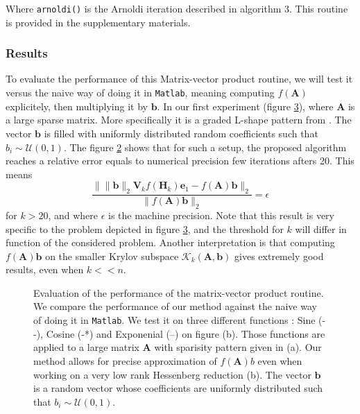\documentclass[11pt]{article}
\numberwithin{equation}{section}
\begin{document}
Where \texttt{arnoldi()} is the Arnoldi iteration described in algorithm 3. This routine is provided in the supplementary materials.

\subsubsection{Results}
To evaluate the performance of this Matrix-vector product routine, we will test it versus the naive way of doing it in \texttt{Matlab}, meaning computing $f(\mathbf{A})$ explicitely, then multiplying it by $\mathbf{b}$. In our first experiment (figure \ref{fig:comp_fab}), where $\mathbf{A}$ is a large sparse matrix. More specifically it is a graded L-shape pattern from \cite{george1978automatic}. The vector $\mathbf{b}$ is filled with uniformly distributed random coefficients such that $b_i\sim\mathcal{U}(0,1)$. The figure \ref{fig:comp_fab_assignement} shows that for such a setup, the proposed algorithm reaches a relative error equals to numerical precision few iterations afters 20. This means 
\begin{equation*}
    \frac{\|\|\mathbf{b}\|_2\mathbf{V}_k f(\mathbf{H}_k)\mathbf{e}_1 - f(\mathbf{A})\mathbf{b}\|_2}{\|f(\mathbf{A})\mathbf{b}\|_2} = \epsilon
\end{equation*}
for $k > 20$, and where $\epsilon$ is the machine precision. Note that this result is very specific to the problem depicted in figure \ref{fig:comp_fab}, and the threshold for $k$ will differ in function of the considered problem. Another interpretation is that computing $f(\mathbf{A})\mathbf{b}$ on the smaller Krylov subspace $\mathcal{K}_k(\mathbf{A},\mathbf{b})$ gives extremely good results, even when $k << n$. 
\begin{figure}
    \begin{subfigure}[b]{.45\linewidth}
        
        \caption{}
        \label{fig:comp_fab_pattern}
    \end{subfigure}
    \begin{subfigure}[b]{.45\linewidth}
        
        \caption{}
        \label{fig:comp_fab_assignement}
    \end{subfigure}
    \caption{Evaluation of the performance of the matrix-vector product routine. We compare the performance of our method against the naive way of doing it in \texttt{Matlab}. We test it on three different functions : Sine (- -), Cosine (-*) and Exponenial (--) on figure (b). Those functions are applied to a large matrix $\mathbf{A}$ with sparisity pattern given in (a). Our method allows for precise approximation of $f(\mathbf{A})b$ even when working on a very low rank Hessenberg reduction (b). The vector $\mathbf{b}$ is a random vector whose coefficients are uniformly distributed such that $b_i\sim\mathcal{U}(0,1)$.}
    \label{fig:comp_fab}
\end{figure}
\end{document}

